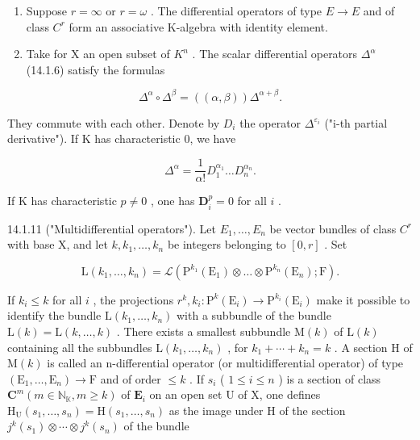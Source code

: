 \begin{enumerate}
\def\labelenumi{\alph{enumi})}
\setcounter{enumi}{1}
\item
  Suppose \(r = \infty\) or \(r = \omega\) . The differential operators of type \(E \to E\) and of class \(C^r\) form an associative K-algebra with identity element.
\item
  Take for X an open subset of \(K^{n}\) . The scalar differential operators \(\Delta^{\alpha}\) (14.1.6) satisfy the formulas
\end{enumerate}

\[
\Delta^ {\alpha} \circ \Delta^ {\beta} = ((\alpha , \beta)) \Delta^ {\alpha + \beta}.
\]

They commute with each other. Denote by \(D_{i}\) the operator \(\Delta^{\varepsilon_{i}}\) ("i-th partial derivative"). If K has characteristic 0, we have

\[
\Delta^ {\alpha} = \frac {1}{\alpha !} D _ {1} ^ {\alpha_{1}} \dots D _ {n} ^ {\alpha_{n}}.
\]

If K has characteristic \(p \neq 0\) , one has \(\mathbf{D}_{i}^{p} = 0\) for all \(i\) .

14.1.11 ("Multidifferential operators"). Let \(E_{1}, \ldots, E_{n}\) be vector bundles of class \(C^{r}\) with base X, and let \(k, k_{1}, \ldots, k_{n}\) be integers belonging to \([0, r]\) . Set

\[
\mathrm{L} (k _ {1}, \dots , k _ {n}) = \mathscr {L} (\mathrm{P} ^ {k _ {1}} (\mathrm{E} _ {1}) \otimes \dots \otimes \mathrm{P} ^ {k _ {n}} (\mathrm{E} _ {n}); \mathrm{F}).
\]

If \(k_i \leqslant k\) for all \(i\) , the projections \(r^k, k_i: \mathrm{P}^k(\mathrm{E}_i) \to \mathrm{P}^{k_i}(\mathrm{E}_i)\) make it possible to identify the bundle \(\mathrm{L}(k_1, \ldots, k_n)\) with a subbundle of the bundle \(\mathrm{L}(k) = \mathrm{L}(k, \ldots, k)\) . There exists a smallest subbundle \(\mathrm{M}(k)\) of \(\mathrm{L}(k)\) containing all the subbundles \(\mathrm{L}(k_1, \ldots, k_n)\) , for \(k_1 + \cdots + k_n = k\) . A section \(\mathrm{H}\) of \(\mathrm{M}(k)\) is called an n-differential operator (or multidifferential operator) of type \((\mathrm{E}_1, \ldots, \mathrm{E}_n) \to \mathrm{F}\) and of order \(\leqslant k\) . If \(s_i\) ( \(1 \leqslant i \leqslant n\) ) is a section of class \(\mathbf{C}^m (m \in \mathbb{N}_{\mathbb{K}}, m \geqslant k)\) of \(\mathbf{E}_i\) on an open set U of X, one defines \(\mathrm{H}_{\mathrm{U}}(s_1, \ldots, s_n) = \mathrm{H}(s_1, \ldots, s_n)\) as the image under H of the section \(j^k(s_1) \otimes \cdots \otimes j^k(s_n)\) of the bundle


